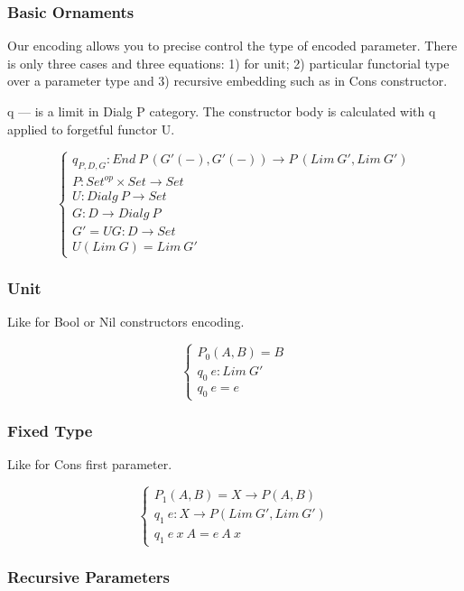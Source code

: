 \documentclass[11pt,oneside]{article}
\begin{document}
\newpage
\subsubsection*{Basic Ornaments}

Our encoding allows you to precise control the type of encoded parameter.
There is only three cases and three equations: 1) for unit; 2) particular
functorial type over a parameter type and 3) recursive embedding such as
in Cons constructor.

q — is a limit in Dialg P category. The constructor body is calculated
with q applied to forgetful functor U.

$$
\begin{cases}
q_{P,D,G} : End\ P\ (G'(-),G'(-)) \rightarrow P\ (Lim\ G',Lim\ G') \\
P : Set^{op} \times Set \rightarrow Set \\
U : Dialg\ P \rightarrow Set \\
G : D \rightarrow Dialg\ P \\
G' = UG : D \rightarrow Set \\
U (Lim\ G) = Lim\ G'
\end{cases}
$$

\subsubsection*{Unit}

Like for Bool or Nil constructors encoding.

$$
\begin{cases}
P_0(A,B) =  B \\
q_0\ e : Lim\ G' \\
q_0\ e = e
\end{cases}
$$

\subsubsection*{Fixed Type}

Like for Cons first parameter.

$$
\begin{cases}
P_1(A,B) = X \rightarrow P(A,B) \\
q_1\ e : X \rightarrow P ( Lim\ G',  Lim\ G' ) \\
q_1\ e\ x\ A = e\ A\ x
\end{cases}
$$

\subsubsection*{Recursive Parameters}
\end{document}
